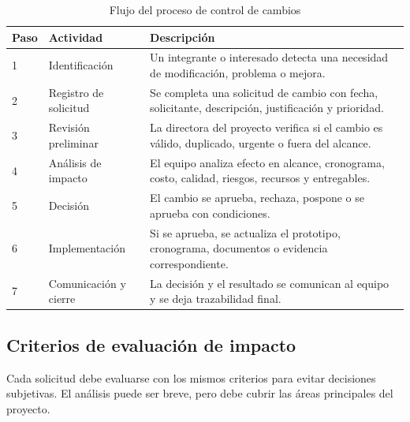 \documentclass[11pt,spanish]{article}
\begin{document}
\begin{table}[H]
\centering
\caption{Flujo del proceso de control de cambios}
\label{tab:flujo-cambios}
{\small
\begin{tabularx}{\textwidth}{p{1.4cm} p{3.3cm} Y}
\toprule
\textbf{Paso} & \textbf{Actividad} & \textbf{Descripción} \\
 & Identificación & Un integrante o interesado detecta una necesidad de modificación, problema o mejora. \\
2 & Registro de solicitud & Se completa una solicitud de cambio con fecha, solicitante, descripción, justificación y prioridad. \\
3 & Revisión preliminar & La directora del proyecto verifica si el cambio es válido, duplicado, urgente o fuera del alcance. \\
4 & Análisis de impacto & El equipo analiza efecto en alcance, cronograma, costo, calidad, riesgos, recursos y entregables. \\
5 & Decisión & El cambio se aprueba, rechaza, pospone o se aprueba con condiciones. \\
6 & Implementación & Si se aprueba, se actualiza el prototipo, cronograma, documentos o evidencia correspondiente. \\
7 & Comunicación y cierre & La decisión y el resultado se comunican al equipo y se deja trazabilidad final. \\
\bottomrule
\end{tabularx}
}
\end{table}

\subsection{Criterios de evaluación de impacto}

Cada solicitud debe evaluarse con los mismos criterios para evitar decisiones subjetivas. El análisis puede ser breve, pero debe cubrir las áreas principales del proyecto.
\end{document}

